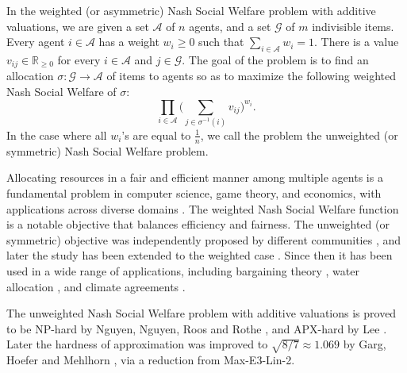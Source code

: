 \documentclass[10pt,a4paper]{article}
\theoremstyle{definition}
\theoremstyle{plain}
\newcommand\calA{{\mathcal{A}}}
\newcommand\calG{{\mathcal{G}}}
\newcommand{\R}{{\mathbb{R}}}
\begin{document}
In the weighted (or asymmetric) Nash Social Welfare problem with additive valuations, we are given a set $\calA$ of $n$ agents, and a set $\calG$ of $m$ indivisible items. Every agent $i \in \calA$ has a weight $w_i \geq 0$ such that $\sum_{i \in \calA}w_i = 1$. There is a value $v_{ij} \in \R_{\geq 0}$ for every $i \in \calA$ and $j \in \calG$.  The goal of the problem is to find an allocation $\sigma: \calG \to \calA$ of items to agents so as to maximize the following weighted Nash Social Welfare of $\sigma$: 
\begin{equation*}
    \prod_{i \in \calA} \bigg(\sum_{j \in \sigma^{-1}(i)}v_{ij}\bigg)^{w_i}.
\end{equation*}
In the case where all $w_i$'s are equal to $\frac1n$, we call the problem the unweighted (or symmetric) Nash Social Welfare problem.

Allocating resources in a fair and efficient manner among multiple agents is a fundamental problem in computer science, game theory, and economics, with applications across diverse domains \cite{KN79, You94, BT96, RW98, Mou04, BT05,  Rot15, BCE16}. The weighted Nash Social Welfare function is a notable objective that balances efficiency and fairness. The unweighted (or symmetric) objective was independently proposed by different communities \cite{Nas50, Kel97, Var74}, and later the study has been extended to the weighted case \cite{HS72, Kal77}. Since then it has been used in a wide range of applications, including bargaining theory \cite{LV07, CM10, Tho86}, water allocation \cite{HLZ13, DHY18}, and climate agreements \cite{YvIW17}.

The unweighted Nash Social Welfare problem with additive valuations is proved to be NP-hard by Nguyen, Nguyen, Roos and Rothe \cite{NNRR12}, and APX-hard by Lee \cite{Lee15}.  Later the hardness of approximation was improved to $\sqrt{8/7} \approx 1.069$ by Garg, Hoefer and Mehlhorn \cite{GHM23}, via a reduction from Max-E3-Lin-2.
\end{document}
